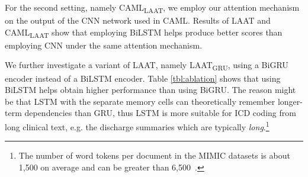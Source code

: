 \documentclass{article}
\begin{document}
For the second setting, namely CAML\textsubscript{LAAT}, we employ our attention mechanism on the output of the CNN network used in CAML. Results of LAAT and CAML\textsubscript{LAAT} show that employing BiLSTM helps produce better scores than employing CNN under the same attention mechanism. 


We further investigate a variant of LAAT, namely LAAT\textsubscript{GRU}, using a BiGRU encoder instead of a BiLSTM encoder. Table \ref{tbl:ablation} shows that using BiLSTM helps obtain higher performance than using BiGRU. The reason might be that LSTM with the separate memory cells can theoretically remember longer-term dependencies than GRU, thus LSTM is more suitable for ICD coding from long clinical text, e.g. the discharge summaries which are typically \emph{long}.\footnote{The number of word tokens per document in the MIMIC datasets is about 1,500 on average and can be greater than 6,500~\cite{mullenbach2018,xie2019ehr,li2020multirescnn}.}






\begingroup
\setlength{\tabcolsep}{2.5pt} \renewcommand{\arraystretch}{1.1} \begin{table}[!t]

\caption{Ablation results on the MIMIC-III-full validation set.   {LAAT\textsubscript{CAML}}: A  LAAT variant using the   label attention mechanism proposed in CAML instead of our proposed label attention mechanism. 
{CAML\textsubscript{LAAT}}: We modify CAML to use our  label attention mechanism instead of the original one in CAML. 
{LAAT\textsubscript{GRU}}: A LAAT variant using BiGRU instead of BiLSTM to learn latent feature vectors representing input words. {All the score differences between LAAT and others are significant} (). }
\label{tbl:ablation}
\end{table}
\endgroup
\end{document}
